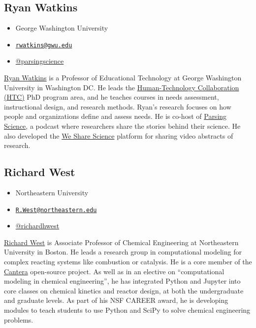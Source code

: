 \documentclass[]{book}
\providecommand{\tightlist}{%
  \setlength{\itemsep}{0pt}\setlength{\parskip}{0pt}}
\begin{document}
\subsection*{Ryan Watkins}\label{ryan-watkins}

\begin{itemize}
\tightlist
\item
  George Washington University
\item
  \href{mailto:rwatkins@gwu.edu}{\nolinkurl{rwatkins@gwu.edu}}
\item
  \href{https://twitter.com/parsingscience}{@parsingscience}
\end{itemize}

\href{https://gsehd.gwu.edu/directory/ryan-watkins}{Ryan Watkins} is a
Professor of Educational Technology at George Washington University in
Washington DC. He leads the
\href{https://go.gwu.edu/phd}{Human-Technology Collaboration (HTC)} PhD
program area, and he teaches courses in needs assessment, instructional
design, and research methods. Ryan's research focuses on how people and
organizations define and assess needs. He is co-host of
\href{https://parsingscience.org/}{Parsing Science}, a podcast where
researchers share the stories behind their science. He also developed
the \href{https://wesharescience.org/}{We Share Science} platform for
sharing video abstracts of research.

\subsection*{Richard West}\label{richard-west}

\begin{itemize}
\tightlist
\item
  Northeastern University
\item
  \href{mailto:R.West@northeastern.edu}{\nolinkurl{R.West@northeastern.edu}}
\item
  \href{https://twitter.com/richardhwest}{@richardhwest}
\end{itemize}

\href{https://web.northeastern.edu/comocheng/}{Richard West} is
Associate Professor of Chemical Engineering at Northeastern University
in Boston. He leads a research group in computational modeling for
complex reacting systems like combustion or catalysis. He is a core
member of the \href{https://cantera.org/}{Cantera} open-source project.
As well as in an elective on ``computational modeling in chemical
engineering'', he has integrated Python and Jupyter into core classes on
chemical kinetics and reactor design, at both the undergraduate and
graduate levels. As part of his NSF CAREER award, he is developing
modules to teach students to use Python and SciPy to solve chemical
engineering problems.
\end{document}
